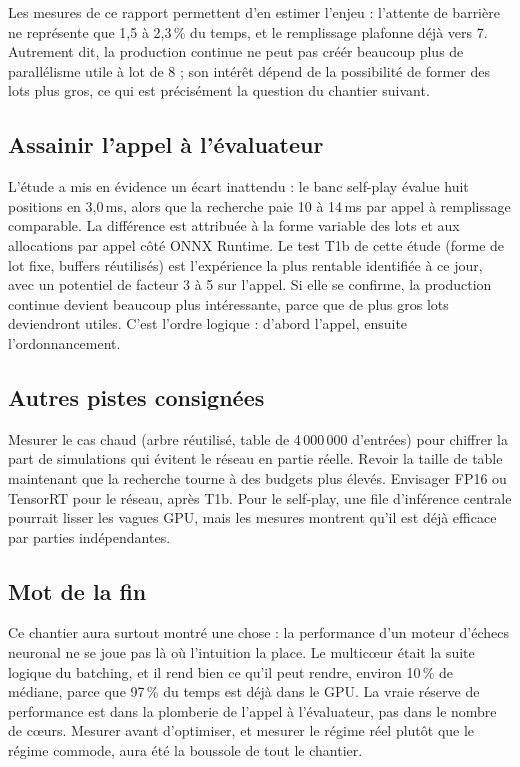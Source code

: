 Les mesures de ce rapport permettent d'en estimer l'enjeu : l'attente de
barri\`ere ne repr\'esente que 1,5 \`a 2,3\,\% du temps, et le remplissage
plafonne d\'ej\`a vers 7. Autrement dit, la production continue ne peut pas
cr\'e\'er beaucoup plus de parall\'elisme utile \`a lot de 8 ; son int\'er\^et
d\'epend de la possibilit\'e de former des lots plus gros, ce qui est pr\'ecis\'ement
la question du chantier suivant.

\subsection{Assainir l'appel \`a l'\'evaluateur}

L'\'etude  a mis en \'evidence un
\'ecart inattendu : le banc self-play \'evalue huit positions en 3,0\,ms,
alors que la recherche paie 10 \`a 14\,ms par appel \`a remplissage
comparable. La diff\'erence est attribu\'ee \`a la forme variable des lots et
aux allocations par appel c\^ot\'e ONNX Runtime. Le test T1b de cette \'etude
(forme de lot fixe, buffers r\'eutilis\'es) est l'exp\'erience la plus
rentable identifi\'ee \`a ce jour, avec un potentiel de facteur 3 \`a 5 sur
l'appel. Si elle se confirme, la production continue devient beaucoup plus
int\'eressante, parce que de plus gros lots deviendront utiles. C'est
l'ordre logique : d'abord l'appel, ensuite l'ordonnancement.

\subsection{Autres pistes consign\'ees}

Mesurer le cas chaud (arbre r\'eutilis\'e, table de 4\,000\,000 d'entr\'ees)
pour chiffrer la part de simulations qui \'evitent le r\'eseau en partie
r\'eelle. Revoir la taille de table maintenant que la recherche tourne \`a
des budgets plus \'elev\'es. Envisager FP16 ou TensorRT pour le r\'eseau,
apr\`es T1b. Pour le self-play, une file d'inf\'erence centrale pourrait
lisser les vagues GPU, mais les mesures montrent qu'il est d\'ej\`a efficace
par parties ind\'ependantes.

\subsection{Mot de la fin}

Ce chantier aura surtout montr\'e une chose : la performance d'un moteur
d'\'echecs neuronal ne se joue pas l\`a o\`u l'intuition la place. Le
multic\oe{}ur \'etait la suite logique du batching, et il rend bien ce qu'il
peut rendre, environ 10\,\% de m\'ediane, parce que 97\,\% du temps est
d\'ej\`a dans le GPU. La vraie r\'eserve de performance est dans la
plomberie de l'appel \`a l'\'evaluateur, pas dans le nombre de c\oe{}urs.
Mesurer avant d'optimiser, et mesurer le r\'egime r\'eel plut\^ot que le
r\'egime commode, aura \'et\'e la boussole de tout le chantier.
